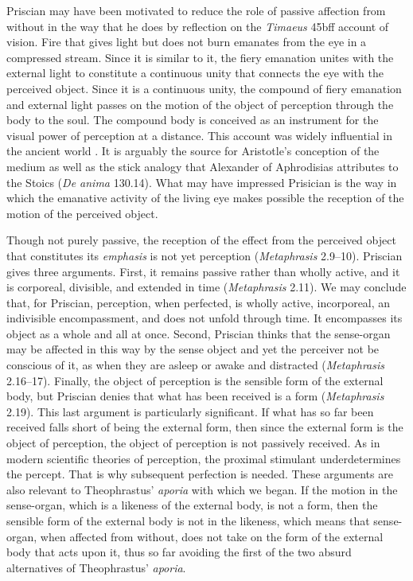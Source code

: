 \documentclass[12pt]{article}
\begin{document}
Priscian may have been motivated to reduce the role of passive affection from without in the way that he does by reflection on the \emph{Timaeus} 45bff account of vision. Fire that gives light but does not burn emanates from the eye in a compressed stream. Since it is similar to it, the fiery emanation unites with the external light to constitute a continuous unity that connects the eye with the perceived object. Since it is a continuous unity, the compound of fiery emanation and external light passes on the motion of the object of perception through the body to the soul. The compound body is conceived as an instrument for the visual power of perception at a distance. This account was widely influential in the ancient world \citep[ch. 1]{Lindberg:1977aa}. It is arguably the source for Aristotle's conception of the medium as well as the stick analogy that Alexander of Aphrodisias attributes to the Stoics (\emph{De anima} 130.14). What may have impressed Prisician is the way in which the emanative activity of the living eye makes possible the reception of the motion of the perceived object.

Though not purely passive, the reception of the effect from the perceived object that constitutes its \emph{emphasis} is not yet perception (\emph{Metaphrasis} 2.9--10). Priscian gives three arguments. First, it remains passive rather than wholly active, and it is corporeal, divisible, and extended in time (\emph{Metaphrasis} 2.11). We may conclude that, for Priscian, perception, when perfected, is wholly active, incorporeal, an indivisible encompassment, and does not unfold through time. It encompasses its object as a whole and all at once. Second, Priscian thinks that the sense-organ may be affected in this way by the sense object and yet the perceiver not be conscious of it, as when they are asleep or awake and distracted (\emph{Metaphrasis} 2.16--17). Finally, the object of perception is the sensible form of the external body, but Priscian denies that what has been received is a form (\emph{Metaphrasis} 2.19). This last argument is particularly significant. If what has so far been received falls short of being the external form, then since the external form is the object of perception, the object of perception is not passively received. As in modern scientific theories of perception, the proximal stimulant underdetermines the percept. That is why subsequent perfection is needed. These arguments are also relevant to Theophrastus' \emph{aporia} with which we began. If the motion in the sense-organ, which is a likeness of the external body, is not a form, then the sensible form of the external body is not in the likeness, which means that sense-organ, when affected from without, does not take on the form of the external body that acts upon it, thus so far avoiding the first of the two absurd alternatives of Theophrastus' \emph{aporia}. 
\end{document}
